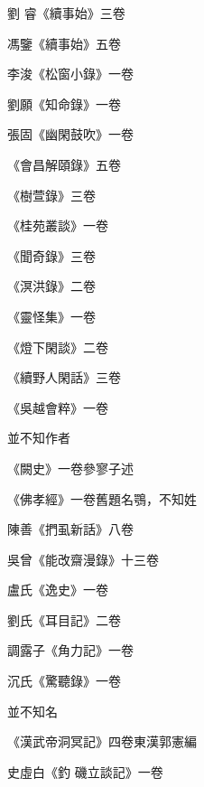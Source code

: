 \begin{pinyinscope}
 劉
 睿《續事始》三卷



 馮鑒《續事始》五卷



 李浚《松窗小錄》一卷



 劉願《知命錄》一卷



 張固《幽閑鼓吹》一卷



 《會昌解頤錄》五卷



 《樹萱錄》三卷



 《桂苑叢談》一卷



 《聞奇錄》三卷



 《溟洪錄》二卷



 《靈怪集》一卷



 《燈下閑談》二卷



 《續野人閑話》三卷



 《吳越會粹》一卷



 並不知作者



 《闕史》一卷參寥子述



 《佛孝經》一卷舊題名鶚，不知姓



 陳善《捫虱新話》八卷



 吳曾《能改齋漫錄》十三卷



 盧氏《逸史》一卷



 劉氏《耳目記》二卷



 調露子《角力記》一卷



 沉氏《驚聽錄》一卷



 並不知名



 《漢武帝洞冥記》四卷東漢郭憲編



 史虛白《釣
 磯立談記》一卷




\end{pinyinscope}
